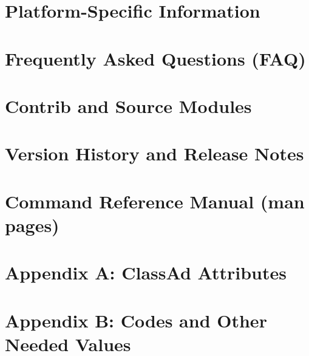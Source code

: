 \documentclass[titlepage,oneside,bookmarks,bookmarksnumbered,plainpages=false,pdfpagelabels]{book}
\begin{document}
\chapter{Platform-Specific Information}
\label{platforms}


\chapter{Frequently Asked Questions (FAQ)}
\label{sec:FAQ}


\chapter{Contrib and Source Modules}
\label{sec:Contrib}


\chapter{Version History and Release Notes}
\label{Version-History}


\chapter{Command Reference Manual (man pages)}
\label{sec:command-reference}



%
%
\if@twoside
	\fancyhead[LE,RO]{\thepage}
	\fancyhead[RE]{\leftmark}
	\fancyhead[LO]{\rightmark}
\else
	\fancyhead[R]{\thepage}
	\fancyhead[L]{\rightmark}
\fi
{}


\chapter{Appendix A:  ClassAd Attributes}
\label{sec:ClassAd-Attributes}

\chapter{Appendix B:  Codes and Other Needed Values}
\label{sec:Magic-Numbers}



\backmatter
{}
\label{index}
\printindex
\end{document}
